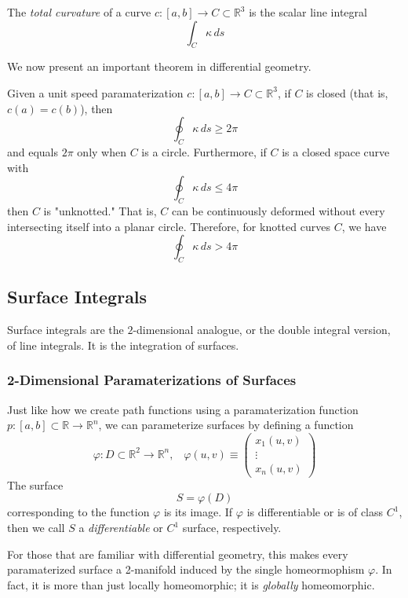   \begin{definition}
  The \textit{total curvature} of a curve $c: [a,b] \longrightarrow C \subset \mathbb{R}^3$ is the scalar line integral 
  \[\int_C \kappa \, ds\]
  \end{definition}

  We now present an important theorem in differential geometry. 
  \begin{theorem}
  Given a unit speed paramaterization $c: [a,b] \longrightarrow C \subset \mathbb{R}^3$, if $C$ is closed (that is, $c(a)=c(b)$), then 
  \[\oint_C \kappa\, ds \geq 2 \pi\]
  and equals $2\pi$ only when $C$ is a circle. Furthermore, if $C$ is a closed space curve with 
  \[\oint_C \kappa\, ds \leq 4\pi\]
  then $C$ is "unknotted." That is, $C$ can be continuously deformed without every intersecting itself into a planar circle. Therefore, for knotted curves $C$, we have
  \[\oint_C \kappa \, ds > 4\pi\]
  \end{theorem}

\subsection{Surface Integrals}

  Surface integrals are the $2$-dimensional analogue, or the double integral version, of line integrals. It is the integration of surfaces. 

  \subsubsection{2-Dimensional Paramaterizations of Surfaces}
  Just like how we create path functions using a paramaterization function $p: [a, b] \subset \mathbb{R} \longrightarrow \mathbb{R}^n$, we can parameterize surfaces by defining a function 
  \[\varphi: D \subset \mathbb{R}^2 \longrightarrow \mathbb{R}^n, \;\;\; \varphi (u, v) \equiv \begin{pmatrix} x_1 (u, v) \\ \vdots \\ x_n (u, v) \end{pmatrix}\]
  The surface 
  \[S = \varphi(D)\]
  corresponding to the function $\varphi$ is its image. If $\varphi$ is differentiable or is of class $C^1$, then we call $S$ a \textit{differentiable} or $C^1$ surface, respectively. 

  For those that are familiar with differential geometry, this makes every paramaterized surface a 2-manifold induced by the single homeormophism $\varphi$. In fact, it is more than just locally homeomorphic; it is \textit{globally} homeomorphic. 


